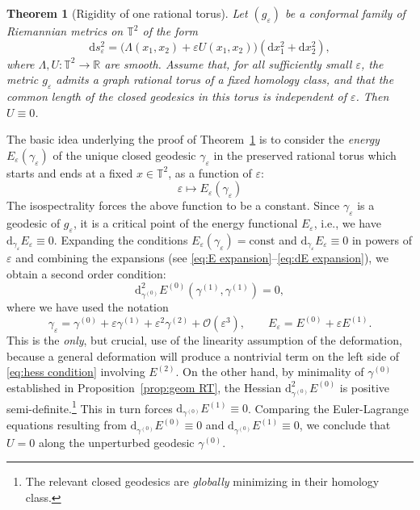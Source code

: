 \documentclass[11pt,letterpaper,oneside]{amsart}
\newcommand{\R}{\mathbb{R}}
\newcommand{\T}{\mathbb{T}}
\renewcommand{\epsilon}{\varepsilon}
\newtheorem{theo}{Theorem}[section]
\theoremstyle{definition}
\theoremstyle{remark}
\theoremstyle{definition}
\theoremstyle{remark}
\newcommand{\CO}{\mathcal{O}}
\newcommand{\dif}{\mathrm{d}}
\begin{document}
{\begin{theo}[Rigidity of one rational torus]\label{thm:RT rig}
     Let $(g_\epsilon)$ be a conformal family of Riemannian metrics on $\T^2$ of the form
     \begin{equation*}
         \dif s_\epsilon^2
         =
         \bigl(\Lambda(x_1,x_2)+\epsilon U(x_1,x_2)\bigr)
         (\dif x_1^2+\dif x_2^2),
     \end{equation*}
     where $\Lambda,U:\T^2\to\R$ are smooth. Assume that, for all sufficiently small $\epsilon$, the metric $g_\epsilon$ admits a graph rational torus of a fixed homology class, and that the common length of the closed geodesics in this torus is independent of $\epsilon$. Then $U\equiv0$.
\end{theo}}

The basic idea underlying the proof of Theorem~\ref{thm:RT rig} is to consider the \emph{energy} $E_\epsilon(\gamma_\epsilon)$ of the unique closed geodesic $\gamma_\epsilon$ in the preserved rational torus which starts and ends at a fixed $x\in\T^2$, as a function of $\epsilon$:
\begin{equation*}
 \epsilon\mapsto    E_\epsilon (\gamma_\epsilon) 
\end{equation*}
The isospectrality forces the above function to be a constant.
Since $\gamma_\epsilon$ is a geodesic of $g_\epsilon$, it is a critical point of the energy functional $E_\epsilon$, i.e., we have $\dif_{\gamma_\epsilon} E_\epsilon \equiv 0$.
Expanding the conditions $E_\epsilon(\gamma_\epsilon) = \text{const}$ and $\dif_{\gamma_\epsilon} E_\epsilon \equiv 0$ in powers of $\epsilon$ and combining the expansions (see \eqref{eq:E expansion}--\eqref{eq:dE expansion}), we obtain a second order condition:
\begin{equation}\label{eq:hess condition}
 \dif^2_{\gamma^{(0)}}E^{(0)}(\gamma^{(1)}, \gamma^{(1)}) = 0,
\end{equation}
where we have used the notation 
\begin{equation*}
    \gamma_\epsilon = \gamma^{(0)} + \epsilon \gamma^{(1)} + \epsilon^2 \gamma^{(2)} + \CO(\epsilon^3), \qquad E_\epsilon = E^{(0)} + \epsilon E^{(1)}.
\end{equation*}
This is the \emph{only}, but crucial, use of the linearity assumption of the deformation, because a general deformation will produce a nontrivial term on the left side of \eqref{eq:hess condition} involving $E^{(2)}$.
On the other hand, by minimality of $\gamma^{(0)}$ established in Proposition~\ref{prop:geom RT}, the Hessian $\dif^2_{\gamma^{(0)}}E^{(0)}$ is positive semi-definite.\footnote{The relevant closed geodesics are \emph{globally} minimizing in their homology class.} 
This in turn forces $\dif_{\gamma^{(0)}} E^{(1)} \equiv 0$. 
Comparing the Euler-Lagrange equations resulting from $\dif_{\gamma^{(0)}} E^{(0)} \equiv 0$ and $\dif_{\gamma^{(0)}} E^{(1)} \equiv 0$, we conclude that $U = 0$ along the unperturbed geodesic $\gamma^{(0)}$. 
\end{document}
